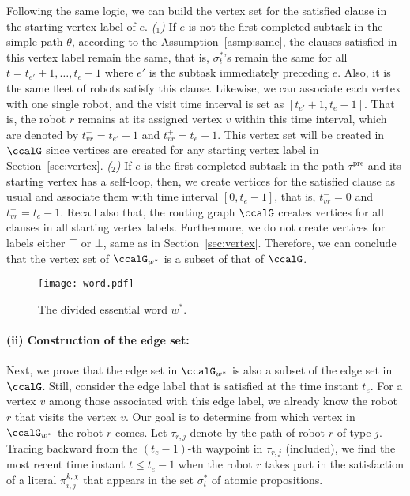 \documentclass[Afour,sageh,times]{sagej}
\newcounter{mycounter}
\renewcommand{\ap}[3]{\mathcal{\pi}_{{#1},{#2}}^{#3}}
\begin{document}
{
Following the same logic, we can build the vertex set for the satisfied clause in the starting vertex label of $e$. {\it ($_1$)} If $e$ is not the first completed subtask in the simple path $\theta$,  according to the Assumption~\ref{asmp:same}, the clauses satisfied in this vertex label remain the same, that is, $\sigma^*_t$'s remain the same for all $t= t_{e'}+1, \ldots, t_{e}-1$ where $e'$ is the subtask immediately preceding $e$. Also, it is the same fleet of robots satisfy this clause. Likewise, we can associate each vertex with one single robot, and the visit time interval is set as $[t_{e'}+1, t_{e}-1]$. That is, the robot $r$ remains at its assigned vertex $v$  within this time interval,
which are denoted by $t_{vr}^- = t_{e'}+1$ and $t_{vr}^+ = t_{e}-1$. This vertex set will be created in $\ccalG$ since vertices are created for any starting vertex label in Section~\ref{sec:vertex}. {\it ($_2$)} \label{app:vertex_b} If  $e$ is the first completed subtask in the path $\tau^\text{pre}$ and its starting vertex has a self-loop, then,  we create vertices for the satisfied clause as usual and associate them with time interval $[0, t_e-1]$, that is, $t_{vr}^-=0$ and $t_{vr}^+ = t_e-1$. Recall also that, the routing graph $\ccalG$ creates vertices for all clauses in all starting  vertex labels.
Furthermore, we do not create vertices for labels either $\top$ or $\bot$, same as in Section~\ref{sec:vertex}. Therefore, we can conclude that the vertex set of $\ccalG_{w^*}$ is a subset of that of $\ccalG$.



\begin{figure}[!t]
  \centering
  \texttt{[image: word.pdf]}
  \caption{The divided essential word $w^*$.}
  \label{fig:word}
\end{figure}

\paragraph{(ii) Construction of the edge set:}\label{app:edge_set} Next, we prove that the edge set in $\ccalG_{w^*}$ is also a subset of the edge set in $\ccalG$. Still, consider the edge label that is satisfied at the time instant $t_e$. For a vertex $v$ among those associated with this edge label, we already know the robot $r$ that visits the vertex $v$. Our goal is to determine from which vertex in $\ccalG_{w^*}$ the robot $r$ comes. Let $\tau_{r,j}$ denote by the path of robot $r$ of type $j$. Tracing backward from the $(t_{e}-1)$-th waypoint in $\tau_{r,j}$ (included), we find the most recent time instant $t\leq t_e -1$  when the robot $r$ takes part in the satisfaction of a literal $\ap{i}{j}{k,\chi}$ that appears in the set $\sigma^*_{t}$ of atomic propositions. 

}
\end{document}
